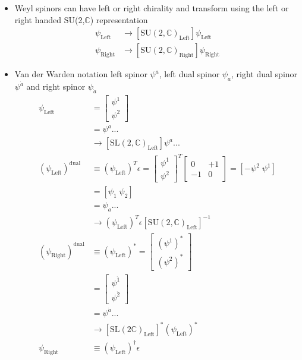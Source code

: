 \documentclass[../main.tex]{subfiles}
\begin{document}
\begin{itemize}
\begin{itemize}
\item Weyl spinors can have left or right chirality and transform using the left or right handed SU(2,$\mathbb{C}$) representation
\begin{align}
\psi_\text{Left}&\rightarrow[\text{SU}(2,\mathbb{C})_\text{Left}]\psi_\text{Left}\\
\psi_\text{Right}&\rightarrow[\text{SU}(2,\mathbb{C})_\text{Right}]\psi_\text{Right}
\end{align}
\item Van der Warden notation left spinor $\psi^a$, left dual spinor $\psi_a$, right dual spinor $\psi^{\dot{a}}$ and right spinor $\psi_{\dot{a}}$
\begin{align}
\psi_\text{Left}
&=\left[\begin{matrix}\psi^1\\\psi^2\end{matrix}\right]\\
&=\psi^a ...\\
&\rightarrow[\text{SL}(2,\mathbb{C})_\text{Left}]\psi^a ...\\
(\psi_\text{Left})^\text{dual}
&\equiv(\psi_\text{Left})^T\epsilon
=\left[\begin{matrix}\psi^1\\\psi^2\end{matrix}\right]^T\left[\begin{matrix}0&+1\\-1&0\end{matrix}\right]
=\left[-\psi^2\;\psi^1\right]\\
&=\left[\psi_1\;\psi_2\right]\\
&=\psi_a ...\\
&\rightarrow(\psi_\text{Left})^T\epsilon[\text{SU}(2,\mathbb{C})_\text{Left}]^{-1}\\
(\psi_\text{Right})^\text{dual}
&\equiv(\psi_\text{Left})^*
=\left[\begin{matrix}(\psi^1)^*\\(\psi^2)^*\end{matrix}\right]\\
&=\left[\begin{matrix}\psi^{\dot{1}}\\\psi^{\dot{2 }}\end{matrix}\right]\\
&=\psi^{\dot{a}} ...\\
&\rightarrow[\text{SL}(2 \mathbb{C})_\text{Left}]^*(\psi_\text{Left})^*\\
\psi_\text{Right}
&\equiv(\psi_\text{Left})^\dagger\epsilon

\end{align}
\end{itemize}
\end{itemize}
\end{document}
